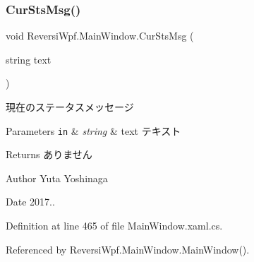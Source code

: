 \subsubsection{\texorpdfstring{Cur\+Sts\+Msg()}{CurStsMsg()}}
{\footnotesize\ttfamily void Reversi\+Wpf.\+Main\+Window.\+Cur\+Sts\+Msg (\begin{DoxyParamCaption}\item[{string}]{text }\end{DoxyParamCaption})}



現在のステータスメッセージ 


\begin{DoxyParams}[1]{Parameters}
\mbox{\tt in}  & {\em string} & text テキスト \\
\hline
\end{DoxyParams}
\begin{DoxyReturn}{Returns}
ありません 
\end{DoxyReturn}
\begin{DoxyAuthor}{Author}
Yuta Yoshinaga 
\end{DoxyAuthor}
\begin{DoxyDate}{Date}
2017.. 
\end{DoxyDate}


Definition at line 465 of file Main\+Window.\+xaml.\+cs.



Referenced by Reversi\+Wpf.\+Main\+Window.\+Main\+Window().

